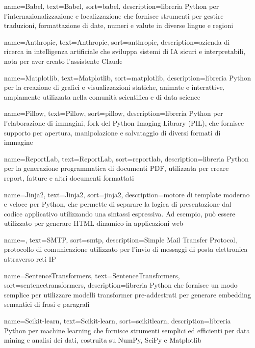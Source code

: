 {
    name=Babel,
        text=Babel,
        sort=babel,
        description={libreria Python per l'internazionalizzazione e localizzazione che fornisce strumenti per gestire traduzioni, formattazione di date, numeri e valute in diverse lingue e regioni}
}

 {
    name=Anthropic,
    text=Anthropic,
    sort=anthropic,
    description={azienda di ricerca in intelligenza artificiale che sviluppa sistemi di IA sicuri e interpretabili, nota per aver creato l'assistente Claude}
}

 {
    name=Matplotlib,
    text=Matplotlib,
    sort=matplotlib,
    description={libreria Python per la creazione di grafici e visualizzazioni statiche, animate e interattive, ampiamente utilizzata nella comunità scientifica e di data science}
}

 {
    name=Pillow,
    text=Pillow,
    sort=pillow,
    description={libreria Python per l'elaborazione di immagini, fork del Python Imaging Library (PIL), che fornisce supporto per apertura, manipolazione e salvataggio di diversi formati di immagine}
}

 {
    name=ReportLab,
    text=ReportLab,
    sort=reportlab,
    description={libreria Python per la generazione programmatica di documenti PDF, utilizzata per creare report, fatture e altri documenti formattati}
}

 {
    name=Jinja2,
    text=Jinja2,
    sort=jinja2,
    description={motore di template moderno e veloce per Python, che permette di separare la logica di presentazione dal codice applicativo utilizzando una sintassi espressiva. Ad esempio, può essere utilizzato per generare HTML dinamico in applicazioni web}
}

 {
    name=,
    text=SMTP,
    sort=smtp,
    description={Simple Mail Transfer Protocol, protocollo di comunicazione utilizzato per l'invio di messaggi di posta elettronica attraverso reti IP}
}

 {
    name=SentenceTransformers,
    text=SentenceTransformers,
    sort=sentencetransformers,
    description={libreria Python che fornisce un modo semplice per utilizzare modelli transformer pre-addestrati per generare embedding semantici di frasi e paragrafi}
}

 {
    name=Scikit-learn,
    text=Scikit-learn,
    sort=scikitlearn,
    description={libreria Python per machine learning che fornisce strumenti semplici ed efficienti per data mining e analisi dei dati, costruita su NumPy, SciPy e Matplotlib}
}

